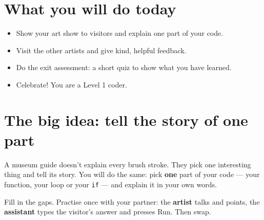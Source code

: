
\section{What you will do today}
\begin{itemize}[leftmargin=1.2em,itemsep=1pt]
  \item Show your art show to visitors and explain one part of your code.
  \item Visit the other artists and give kind, helpful feedback.
  \item Do the exit assessment: a short quiz to show what you have learned.
  \item Celebrate! You are a Level 1 coder.
\end{itemize}

\section{The big idea: tell the story of one part}
A museum guide doesn't explain every brush stroke. They pick one interesting thing and tell its story. You will do the same: pick \textbf{one} part of your code --- your function, your loop or your \texttt{if} --- and explain it in your own words.

\begin{exercise}
Fill in the gaps. Practise once with your partner: the \textbf{artist} talks and points, the \textbf{assistant} types the visitor's answer and presses Run. Then swap.
\end{exercise}

